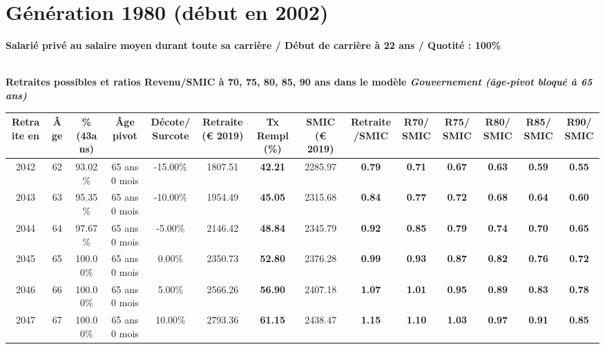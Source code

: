\newpage 
 
\section{Génération 1980 (début en 2002)\label{SMPT_100_1980_22_0}} 
 
{\bf \noindent Salarié privé au salaire moyen durant toute sa carrière / Début de carrière à 22 ans / Quotité : 100\%}  ~ 

 ~\\{\bf \noindent Retraites possibles et ratios Revenu/SMIC à 70, 75, 80, 85, 90 ans dans le modèle \emph{Gouvernement (âge-pivot bloqué à 65 ans)}}  
 
\begin{adjustbox}{max width=\textwidth} 
\begin{tabular}[htb]{|c|c||c|c|c||c|c||c|c||c|c|c|c|c|} 
\hline 
 Retraite en &  Âge &  \%(43ans) &  Âge pivot &  Décote/Surcote &  Retraite (\euro{} 2019) &  Tx Rempl(\%) &  SMIC (\euro{} 2019) &  Retraite/SMIC &  R70/SMIC &  R75/SMIC &  R80/SMIC &  R85/SMIC &  R90/SMIC \\ 
\hline \hline 
 2042 &  62 &  93.02\% &  65 ans 0 mois &  -15.00\% &  1807.51 &  {\bf 42.21} &  2285.97 &  {\bf {\color{red} 0.79}} &  {\bf {\color{red} 0.71}} &  {\bf {\color{red} 0.67}} &  {\bf {\color{red} 0.63}} &  {\bf {\color{red} 0.59}} &  {\bf {\color{red} 0.55}} \\ 
\hline 
 2043 &  63 &  95.35\% &  65 ans 0 mois &  -10.00\% &  1954.49 &  {\bf 45.05} &  2315.68 &  {\bf {\color{red} 0.84}} &  {\bf {\color{red} 0.77}} &  {\bf {\color{red} 0.72}} &  {\bf {\color{red} 0.68}} &  {\bf {\color{red} 0.64}} &  {\bf {\color{red} 0.60}} \\ 
\hline 
 2044 &  64 &  97.67\% &  65 ans 0 mois &  -5.00\% &  2146.42 &  {\bf 48.84} &  2345.79 &  {\bf {\color{red} 0.92}} &  {\bf {\color{red} 0.85}} &  {\bf {\color{red} 0.79}} &  {\bf {\color{red} 0.74}} &  {\bf {\color{red} 0.70}} &  {\bf {\color{red} 0.65}} \\ 
\hline 
 2045 &  65 &  100.00\% &  65 ans 0 mois &  0.00\% &  2350.73 &  {\bf 52.80} &  2376.28 &  {\bf {\color{red} 0.99}} &  {\bf {\color{red} 0.93}} &  {\bf {\color{red} 0.87}} &  {\bf {\color{red} 0.82}} &  {\bf {\color{red} 0.76}} &  {\bf {\color{red} 0.72}} \\ 
\hline 
 2046 &  66 &  100.00\% &  65 ans 0 mois &  5.00\% &  2566.26 &  {\bf 56.90} &  2407.18 &  {\bf 1.07} &  {\bf 1.01} &  {\bf {\color{red} 0.95}} &  {\bf {\color{red} 0.89}} &  {\bf {\color{red} 0.83}} &  {\bf {\color{red} 0.78}} \\ 
\hline 
 2047 &  67 &  100.00\% &  65 ans 0 mois &  10.00\% &  2793.36 &  {\bf 61.15} &  2438.47 &  {\bf 1.15} &  {\bf 1.10} &  {\bf 1.03} &  {\bf {\color{red} 0.97}} &  {\bf {\color{red} 0.91}} &  {\bf {\color{red} 0.85}} \\ 
\hline 
\hline 
\end{tabular} 
\end{adjustbox} 
 
